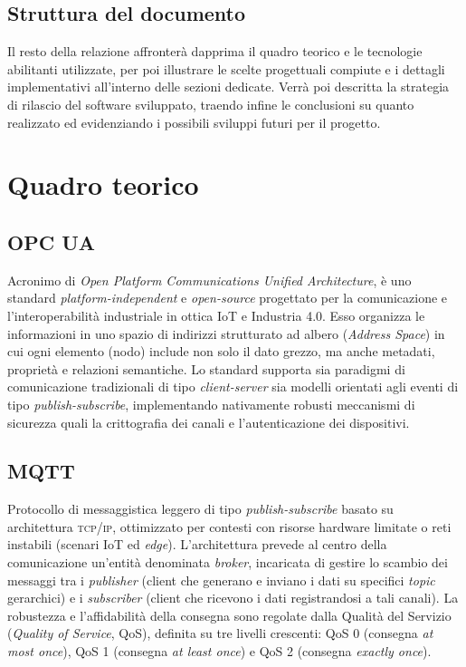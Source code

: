\documentclass[12pt]{article}
\begin{document}
    \subsection{Struttura del documento}
    Il resto della relazione affronterà dapprima il quadro teorico e le tecnologie abilitanti utilizzate, per poi illustrare le scelte progettuali compiute e i dettagli implementativi all'interno delle sezioni dedicate. Verrà poi descritta la strategia di rilascio del software sviluppato, traendo infine le conclusioni su quanto realizzato ed evidenziando i possibili sviluppi futuri per il progetto.

    \section{Quadro teorico}

    \subsection{OPC UA}
    
    Acronimo di \textit{Open Platform Communications Unified Architecture}, è uno standard \textit{platform-independent} e \textit{open-source} progettato per la comunicazione e l'interoperabilità industriale in ottica IoT e Industria 4.0. 
    Esso organizza le informazioni in uno spazio di indirizzi strutturato ad albero (\textit{Address Space}) in cui ogni elemento (nodo) include non solo il dato grezzo, ma anche metadati, proprietà e relazioni semantiche. 
    Lo standard supporta sia paradigmi di comunicazione tradizionali di tipo \textit{client-server} sia modelli orientati agli eventi di tipo \textit{publish-subscribe}, implementando nativamente robusti meccanismi di sicurezza quali la crittografia dei canali e l'autenticazione dei dispositivi.
    
    \subsection{MQTT}
    
    Protocollo di messaggistica leggero di tipo \textit{publish-subscribe} basato su architettura \textsc{tcp/ip}, ottimizzato per contesti con risorse hardware limitate o reti instabili (scenari IoT ed \textit{edge}). 
    L'architettura prevede al centro della comunicazione un'entità denominata \textit{broker}, incaricata di gestire lo scambio dei messaggi tra i \textit{publisher} (client che generano e inviano i dati su specifici \textit{topic} gerarchici) e i \textit{subscriber} (client che ricevono i dati registrandosi a tali canali). 
    La robustezza e l'affidabilità della consegna sono regolate dalla Qualità del Servizio (\textit{Quality of Service}, QoS), definita su tre livelli crescenti: QoS 0 (consegna \textit{at most once}), QoS 1 (consegna \textit{at least once}) e QoS 2 (consegna \textit{exactly once}).
    
\end{document}
